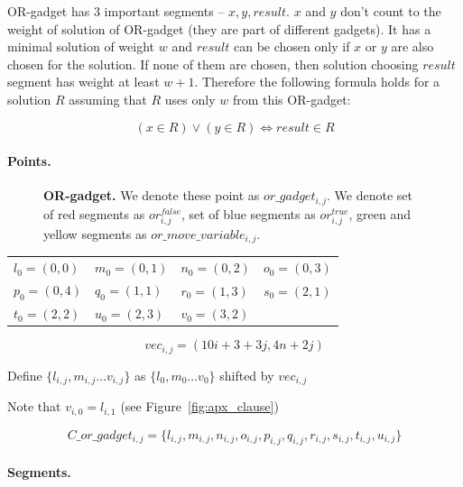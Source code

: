 OR-gadget has 3 important segments
-- $x, y, result$. $x$ and $y$ don't count to the weight of solution
of OR-gadget (they are part of different gadgets).
It has a minimal solution of weight $w$
and $result$ can be chosen only if $x$ or $y$ are also chosen
for the solution.
If none of them are chosen, then solution
choosing $result$ segment has weight at least $w+1$.
Therefore the following formula holds for a solution $R$
assuming that $R$ uses only $w$ from this OR-gadget:

$$ (x \in R) \lor (y \in R) \iff result \in R  $$

\paragraph{Points.}

\begin{figure}[h]
\centering
\def\svgwidth{0.5\columnwidth}

\caption{
\textbf{OR-gadget.} We denote these point as $or\_gadget_{i, j}$. 
We denote set of red segments as $or^{false}_{i, j}$,
set of blue segments as $or^{true}_{i, j}$,
green and yellow segments as $or\_move\_variable_{i, j}$.
}
\label{fig:apx_or_gadget}
\end{figure}

	\begin{center}
\begin{tabular}{ l l l l}

	$l_0 = (0, 0)$ &
	$m_0 = (0, 1)$ &
	$n_0 = (0, 2)$ &
	$o_0 = (0, 3)$ \\
	$p_0 = (0, 4)$ &
	$q_0 = (1, 1)$ &
	$r_0 = (1, 3)$ &
	$s_0 = (2, 1)$ \\
	$t_0 = (2, 2)$ &
	$u_0 = (2, 3)$ &
	$v_0 = (3, 2)$ &
\end{tabular}
\end{center}


	$$vec_{i, j} = (10i + 3 + 3j, 4n + 2j)$$
	
	Define 
	$\{ l_{i, j}, m_{i, j} \ldots v_{i, j} \}$
	as $\{l_0, m_0 \ldots v_0\}$ shifted by $vec_{i, j}$

Note that $v_{i, 0} = l_{i, 1}$ (see Figure~\ref{fig:apx_clause})
 
  $$C\_or\_gadget_{i, j} = 
 \{l_{i, j}, m_{i, j}, n_{i, j}, o_{i, j},
 p_{i, j}, q_{i, j}, r_{i, j}, s_{i, j}, t_{i, j}, u_{i, j} \}
 $$
 
\paragraph{Segments.}


